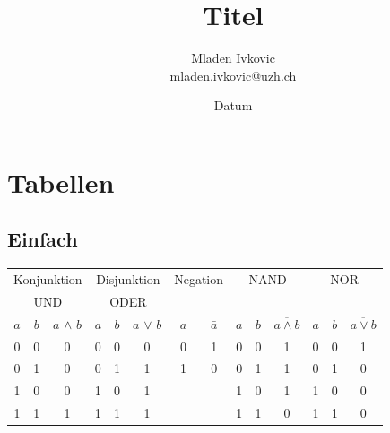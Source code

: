 


\title{Titel}
\author{Mladen Ivkovic\\
mladen.ivkovic@uzh.ch\\
}
\date{Datum}





\maketitle
\clearpage
\tableofcontents %
\clearpage













\section{Tabellen}
\subsection{Einfach}
\begin{center}
\begin{tabular}[c]{c | c | c || c| c | c || c | c || c | c | c || c| c| c}
\multicolumn{3}{c||}{Konjunktion}	&	\multicolumn{3}{c||}{Disjunktion} & \multicolumn{2}{c||}{Negation} & \multicolumn{3}{c||}{NAND} & \multicolumn{3}{c}{NOR}\\
\multicolumn{3}{c||}{UND}	&	\multicolumn{3}{c||}{ODER} & \multicolumn{2}{c||}{} & \multicolumn{3}{c||}{} & \multicolumn{3}{c}{}\\
\hline
$a$ & $b$ & $a$ $\wedge$ $b$ & $a$ & $b$ & $a$ $\vee$ $b$ & $a$ & $\bar{a}$ & $a$ & $b$ & $\overline{a \wedge b}$ & $a$ & $b$ & $\overline{a \vee b}$\\
\hline
0 & 0 & 0 & 0 & 0 & 0 & 0 & 1 & 0 & 0 & 1 & 0 & 0 & 1\\
0 & 1 & 0 & 0 & 1 & 1 & 1 & 0 & 0 & 1 & 1 & 0 & 1 & 0\\
1 & 0 & 0 & 1 & 0 & 1 & & & 1 & 0 & 1 & 1 & 0 & 0\\
1 & 1 & 1 & 1 & 1 & 1 & & & 1 & 1 & 0 & 1 & 1 & 0\\
\hline
\end{tabular}
\end{center}




